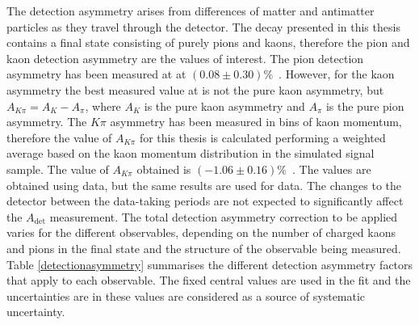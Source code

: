 The detection asymmetry arises from differences of matter and antimatter particles as they travel through the detector. The \btodkst decay presented in this thesis contains a final state consisting of purely pions and kaons, therefore the pion and kaon detection asymmetry are the values of interest. The pion detection asymmetry has been measured at \lhcb at $(0.08 \pm 0.30)\%$~\cite{pi_det_asym}. However, for the kaon asymmetry the best measured value at \lhcb is not the pure kaon asymmetry, but $A_{K\pi} = A_K - A_{\pi}$, where $A_K$ is the pure kaon asymmetry and $A_{\pi}$ is the pure pion asymmetry. The $K\pi$ asymmetry has been measured in bins of kaon momentum, therefore the value of $A_{K\pi}$ for this thesis is calculated performing a weighted average based on the kaon momentum distribution in the simulated signal sample. The value of $A_{K\pi}$ obtained is $(-1.06 \pm 0.16)\%$~\cite{k_det_asym}. The values are obtained using \runone data, but the same results are used for \runtwo data. The changes to the detector between the data-taking periods are not expected to significantly affect the $A_{\text{det}}$ measurement. The total detection asymmetry correction to be applied varies for the different \CP observables, depending on the number of charged kaons and pions in the final state and the structure of the \CP observable being measured. Table \ref{detectionasymmetry} summarises the different detection asymmetry factors that apply to each observable. The fixed central values are used in the \CP fit and the uncertainties are in these values are considered as a source of systematic uncertainty.

